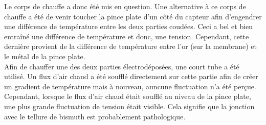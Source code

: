Le corps de chauffe a donc été mis en question. Une alternative à ce corps de chauffe a été de venir toucher la pince plate d'un côté du
capteur afin d'engendrer une différence de température entre les deux parties coudées. Ceci a bel et bien entraîné une différence de
température et donc, une tension. Cependant, cette dernière provient de la différence de température entre l'or (sur la membrane) et le métal
de la pince plate. \\

Afin de chauffer une des deux parties électrodéposées, une court tube a été utilisé. Un flux d'air chaud a été soufflé directement sur cette
partie afin de créer un gradient de température mais à nouveau, auncune fluctuation n'a été perçue. Cependant, lorsque le flux d'air chaud
était soufflé au niveau de la pince plate, une plus grande fluctuation de tension était visible. Cela signifie que la jonction avec le tellure
de bismuth est probablement pathologique.\\

